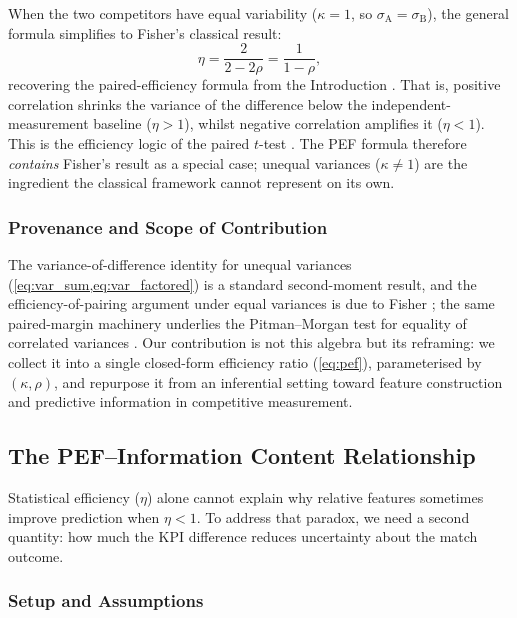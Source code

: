 When the two competitors have equal variability ($\kappa=1$, so $\sigma_{\mathrm{A}}=\sigma_{\mathrm{B}}$), the general formula simplifies to Fisher's classical result:
\begin{equation*}
  \eta = \frac{2}{2-2\rho} = \frac{1}{1-\rho},
\end{equation*}
recovering the paired-efficiency formula from the Introduction \parencite{fisher1935}. That is, positive correlation shrinks the variance of the difference below the independent-measurement baseline ($\eta>1$), whilst negative correlation amplifies it ($\eta<1$). This is the efficiency logic of the paired $t$-test \cite{student1908}. The PEF formula therefore \emph{contains} Fisher's result as a special case; unequal variances ($\kappa\neq 1$) are the ingredient the classical framework cannot represent on its own.

\subsubsection{Provenance and Scope of Contribution}

The variance-of-difference identity for unequal variances (\cref{eq:var_sum,eq:var_factored}) is a standard second-moment result, and the efficiency-of-pairing argument under equal variances is due to Fisher \parencite{fisher1935}; the same paired-margin machinery underlies the Pitman--Morgan test for equality of correlated variances \parencite{pitman1939,morgan1939}. Our contribution is not this algebra but its reframing: we collect it into a single closed-form efficiency ratio (\cref{eq:pef}), parameterised by $(\kappa,\rho)$, and repurpose it from an inferential setting toward feature construction and predictive information in competitive measurement.

\subsection{The PEF--Information Content Relationship}

Statistical efficiency ($\eta$) alone cannot explain why relative features sometimes improve prediction when $\eta<1$. To address that paradox, we need a second quantity: how much the KPI difference reduces uncertainty about the match outcome.

\subsubsection{Setup and Assumptions}
\label{sec:mi_setup}

